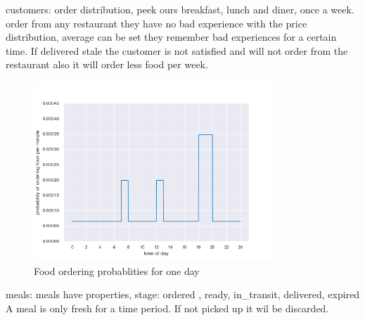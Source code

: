 customers:
order distribution, peek ours breakfast, lunch and  diner, once a week.
order from any restaurant they have no bad experience with
the price distribution, average can be set
they remember bad experiences for a certain time.
If delivered stale the customer is not satisfied and will not order from the restaurant also
it will order less food per week.

\begin{figure}
    \centering
    \includegraphics[width=9cm]{sections/pics/food_ordering_distribution}
    \caption{Food ordering probablities for one day}
    \label{fig:food_ordering_distribution}
\end{figure}



meals:
meals have properties, stage: ordered , ready, in\_transit, delivered, expired
A meal is only fresh for a time period.
If not picked up it wil be discarded.





